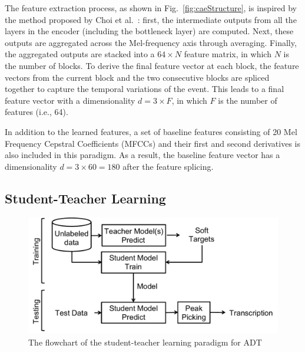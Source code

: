 \documentclass{article}
\newcommand{\comment}[1]{{\textcolor{blue}{#1}}}
\begin{document}
The feature extraction process, as shown in Fig.~\ref{fig:caeStructure}, is inspired by the method proposed by Choi et al.~\cite{Choi2017a}: first, the intermediate outputs from all the layers in the encoder (including the bottleneck layer) are computed. Next, these outputs are aggregated across the Mel-frequency axis through averaging. Finally, the aggregated outputs are stacked into a $64 \times N$ feature matrix, in which $N$ is the number of blocks. %
To derive the final feature vector at each block, the feature vectors from the current block and the two consecutive blocks are spliced together to capture the temporal variations of the event. This leads to a final feature vector with a dimensionality $d = 3 \times F$, in which $F$ is the number of features (i.e., 64). 

In addition to the learned features, a set of baseline features consisting of 20 Mel Frequency Cepstral Coefficients (MFCCs) and their first and second derivatives is also included in this paradigm. As a result, the baseline feature vector has a dimensionality $d = 3 \times 60 = 180$ after the feature splicing. 

\subsection{Student-Teacher Learning}
\label{subsec:studentTeacher}

\begin{figure}
\centering
\includegraphics[width = \columnwidth]{./figs/studentTeacherSys.pdf}
\caption{The flowchart of the student-teacher learning paradigm for ADT}
\label{fig:studentTeacherFlow}
\end{figure}
\end{document}
